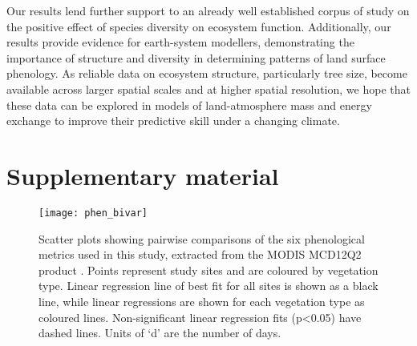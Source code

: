 \documentclass[11pt,a4paper]{article}
\newcommand{\beginsupplement}{%
	\setcounter{table}{0}
	\renewcommand{\thetable}{S\arabic{table}}%
	\setcounter{figure}{0}
	\renewcommand{\thefigure}{S\arabic{figure}}%
	}
\begin{document}
Our results lend further support to an already well established corpus of study
on the positive effect of species diversity on ecosystem function.
Additionally, our results provide evidence for earth-system modellers,
demonstrating the importance of structure and diversity in determining patterns
of land surface phenology. As reliable data on ecosystem structure,
particularly tree size, become available across larger spatial scales and at
higher spatial resolution, we hope that these data can be explored in models of
land-atmosphere mass and energy exchange to improve their predictive skill
under a changing climate.

\printbibliography

\section{Supplementary material}
\beginsupplement

\begin{figure}[H]
\centering
	\texttt{[image: phen\_bivar]}
	\caption{Scatter plots showing pairwise comparisons of the six phenological
		metrics used in this study, extracted from the MODIS MCD12Q2 product
		\citep{MCD12Q2}. Points represent study sites and are coloured by vegetation
		type. Linear regression line of best fit for all sites is shown as a black
		line, while linear regressions are shown for each vegetation type as coloured
		lines. Non-significant linear regression fits (p<0.05) have dashed lines. 
		Units of `d' are the number of days.}
	\label{phen_bivar}
\end{figure}
\end{document}
